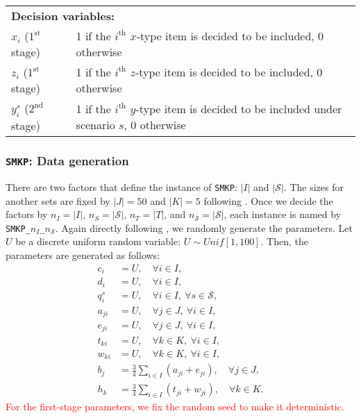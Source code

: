 \begin{table}[H]
{\begin{tabular}{ll}
			\multicolumn{2}{l}{\textbf{Decision variables:}} \\
			$x_{i}$ ($1^{\textrm{st}}$ stage) & 1 if the $i^{\mathrm{th}}$ $x$-type item is decided to be included, 0 otherwise \\ 
			$z_{i}$ ($1^{\textrm{st}}$ stage) & 1 if the $i^{\mathrm{th}}$ $z$-type item is decided to be included, 0 otherwise \\ 
			$y_{i}^s$ ($2^{\textrm{nd}}$ stage)& 1 if the $i^{\mathrm{th}}$ $y$-type item is decided to be included under scenario $s$, 0 otherwise  \\
			\bottomrule
		\end{tabular}
	}
\end{table} 

\subsubsection{\texttt{SMKP}: Data generation}
There are two factors that define the instance of \texttt{SMKP}: $|I|$ and $|\mathcal{S}|$. The sizes for another sets are fixed by $|J|=50$ and $|K|=5$ following \cite{journal:AAD2014}. Once we decide the factors by $n_I=|I|$, $n_S=|\mathcal{S}|$, $n_T=|T|$, and $n_\mathcal{S}=|\mathcal{S}|$, each instance is named by \texttt{SMKP\_$n_I$\_$n_\mathcal{S}$}. Again directly following \cite{journal:AAD2014}, we randomly generate the parameters. Let $U$ be a discrete uniform random variable: $U\sim Unif[1,100]$. Then, the parameters are generated as follows:
\begin{align*}
c_i		&=	U,\quad\forall i\in I, \\
d_i		&=	U,\quad\forall i\in I, \\
q_i^s	&= 	U,\quad\forall i\in I,\ \forall s\in\mathcal{S},\\
a_{ji}	&=	U,\quad\forall j\in J,\ \forall i\in I, \\
e_{ji}	&=	U,\quad\forall j\in J,\ \forall i\in I, \\
t_{ki}	&=	U,\quad\forall k\in K,\ \forall i\in I, \\
w_{ki}	&=	U,\quad\forall k\in K,\ \forall i\in I,  \\
b_j		&=	\frac{3}{4}\sum_{i\in I}\left(a_{ji}+e_{ji}\right),\quad\forall j\in J, \\
h_k		&=	\frac{3}{4}\sum_{i\in I}\left(t_{ji}+w_{ji}\right),\quad\forall k\in K. 
\end{align*}
\textcolor{red}{For the first-stage parameters, we fix the random seed to make it deterministic.}

